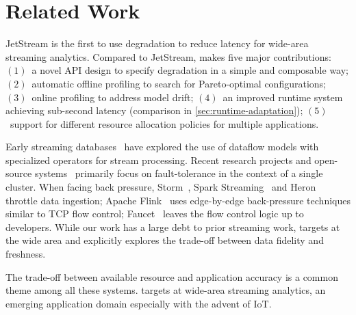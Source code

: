 \section{Related Work}
\label{sec:related-work}

 JetStream is the first to use degradation to reduce latency
for wide-area streaming analytics. Compared to JetStream, \sysname{} makes five
major contributions: $(1)$~a novel API design to specify degradation in a simple
and composable way; $(2)$~automatic offline profiling to search for
Pareto-optimal configurations; $(3)$~online profiling to address model drift;
$(4)$~an improved runtime system achieving sub-second latency (comparison in
\autoref{sec:runtime-adaptation}); $(5)$~support for different resource
allocation policies for multiple applications.

 Early streaming
databases~\cite{abadi2005design, chandrasekaran2003telegraphcq} have explored
the use of dataflow models with specialized operators for stream
processing. Recent research projects and open-source
systems~\cite{akidau2013millwheel, toshniwal2014storm, sanjeev2015twitter,
  zaharia2013discretized, carbone2015apache} primarily focus on fault-tolerance
in the context of a single cluster. When facing back pressure,
Storm~\cite{toshniwal2014storm}, Spark Streaming~\cite{zaharia2013discretized}
and Heron~\cite{sanjeev2015twitter} throttle data ingestion; Apache
Flink~\cite{carbone2015apache} uses edge-by-edge back-pressure techniques
similar to TCP flow control; Faucet~\cite{lattuada2016faucet} leaves the flow
control logic up to developers.  While our work has a large debt to prior
streaming work, \sysname{} targets at the wide area and explicitly explores the
trade-off between data fidelity and freshness.

  The trade-off between
available resource and application accuracy is a common theme among all these
systems. \sysname{} targets at wide-area streaming analytics, an emerging
application domain especially with the advent of IoT\@.

